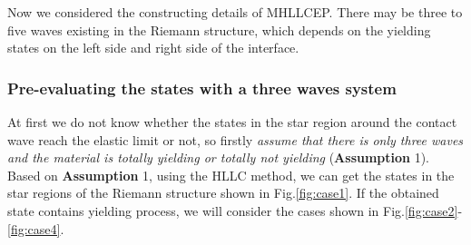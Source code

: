 \documentclass{article}
\numberwithin{equation}{section}
\numberwithin{table}{section}
\begin{document}
Now we considered the constructing details of MHLLCEP. There may be three to five waves existing  in the Riemann structure, which depends on the yielding states  on the left side and right side of the interface.

\subsubsection{Pre-evaluating the states with a three waves system}\label{sec:case1}
At first we do not know whether the states in the star region around the contact wave reach the elastic limit or not, so firstly \emph{assume that there is only three waves and the material is totally yielding or totally not yielding} (\textbf{Assumption} 1). Based on \textbf{Assumption} 1, using the HLLC method, we can get the states in the star regions of the Riemann structure shown in  Fig.\ref{fig:case1}. If the obtained state contains yielding process, we will consider the cases shown in Fig.\ref{fig:case2}-\ref{fig:case4}.
\end{document}
